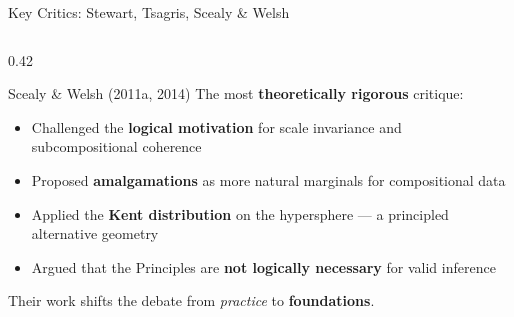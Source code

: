 \begin{frame}{Key Critics: Stewart, Tsagris, Scealy \& Welsh}
\begin{columns}[T]
  \begin{column}{0.42\textwidth}
    \begin{block}{Scealy \& Welsh (2011a, 2014)}
      The most \textbf{theoretically rigorous} critique:
      \begin{itemize}
        \item Challenged the \textbf{logical motivation} for scale
              invariance and subcompositional coherence
        \item Proposed \textbf{amalgamations} as more natural
              marginals for compositional data
        \item Applied the \textbf{Kent distribution} on the
              hypersphere — a principled alternative geometry
        \item Argued that the Principles are \textbf{not logically
              necessary} for valid inference
      \end{itemize}
    \end{block}

    \vspace{0.1cm}
    \begin{alertblock}{}
      Their work shifts the debate from \emph{practice} to
      \textbf{foundations}.
    \end{alertblock}
  \end{column}
\end{columns}

\end{frame}

